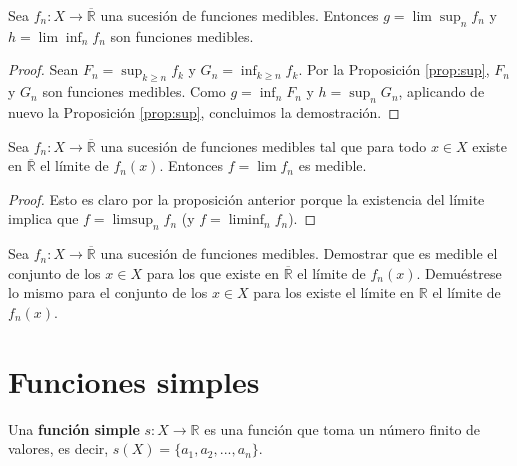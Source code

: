 \begin{prop}
    Sea $f_n: X \longrightarrow \overline{\mathbb{R}}$ una sucesión de funciones medibles. Entonces $g = \lim{\sup_n{f_n}}$ y $h = \lim{\inf_n{f_n}}$ son funciones medibles.
\end{prop}

\begin{proof}
    Sean $F_n = \sup_{k \ge n}{f_k}$ y $G_n = \inf_{k \ge n}{f_k}$. Por la Proposición \ref{prop:sup}, $F_n$ y $G_n$ son funciones medibles. Como $g = \inf_n{F_n}$ y $h = \sup_n{G_n}$, aplicando de nuevo la Proposición \ref{prop:sup}, concluimos la demostración.
\end{proof}

\begin{prop}
    Sea $f_n: X \longrightarrow \overline{\mathbb{R}}$ una sucesión de funciones medibles tal que para todo $x \in X$ existe en $\overline{\mathbb{R}}$ el límite de $f_n(x)$. Entonces $f = \lim{f_n}$ es medible.
\end{prop}

\begin{proof}
    Esto es claro por la proposición anterior porque la existencia del límite implica que $f = \limsup_n{f_n}$ (y $f = \liminf_n{f_n}$).
\end{proof}

\begin{ejemplo}
    Sea $f_n: X \longrightarrow \overline{\mathbb{R}}$ una sucesión de funciones medibles. Demostrar que es medible el conjunto de los $x \in X$ para los que existe en $\overline{\mathbb{R}}$ el límite de $f_n(x)$. Demuéstrese lo mismo para el conjunto de los $x \in X$ para los existe el límite en $\mathbb{R}$ el límite de $f_n(x)$.
\end{ejemplo}

\section{Funciones simples}

\begin{defi}
    Una \textbf{función simple} $s: X \longrightarrow \mathbb{R}$ es una función que toma un número finito de valores, es decir, $s(X) = \{ a_1, a_2, ..., a_n\}$.
\end{defi}

